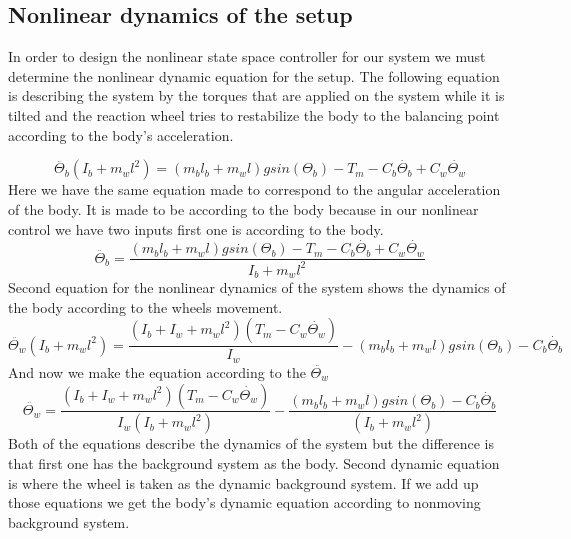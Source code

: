 \subsection{Nonlinear dynamics of the setup}

In order to design the nonlinear state space controller for our system we must determine the nonlinear dynamic equation for the setup.
The following equation is describing the system by the torques that are applied on the system while it is tilted and the reaction wheel tries to restabilize the body to the balancing point according to the body's acceleration.

\begin{equation}
\label{eq:Non-linear dynamics11}
\ddot{\Theta_{b}}(I_{b}+m_{w}l^{2})=(m_{b}l_{b}+m_{w}l)gsin(\Theta_{b})-T_{m}-C_{b}\dot{\Theta_{b}}+C_{w}\dot{\Theta_{w}}
\end{equation}
Here we have the same equation made to correspond to the angular acceleration of the body.
It is made to be according to the body because in our nonlinear control we have two inputs first one is according to the body.
\begin{equation}
\label{eq:Non-linear dynamics12}
\ddot{\Theta_{b}}=\frac{(m_{b}l_{b}+m_{w}l)gsin(\Theta_{b})-T_{m}-C_{b}\dot{\Theta_{b}}+C_{w}\dot{\Theta_{w}}}{I_{b}+m_{w}l^{2}}
\end{equation}
Second equation for the nonlinear dynamics of the system shows the dynamics of the body according to the wheels movement.
\begin{equation}
\label{eq:Non-linear dynamics21}
\ddot{\Theta_{w}}(I_{b}+m_{w}l^{2})=\frac{(I_{b}+I_{w}+m_{w}l^{2})(T_{m}-C_{w}\dot{\Theta_{w}})}{I_{w}}-(m_{b}l_{b}+m_{w}l)gsin(\Theta_{b})-C_{b}\dot{\Theta_{b}}
\end{equation}
And now we make the equation according to the $\ddot{\Theta_{w}}$
\begin{equation}
\label{eq:Non-linear dynamics22}
\ddot{\Theta_{w}}=\frac{(I_{b}+I_{w}+m_{w}l^{2})(T_{m}-C_{w}\dot{\Theta_{w}})}{I_{w}(I_{b}+m_{w}l^{2})}-\frac{(m_{b}l_{b}+m_{w}l)gsin(\Theta_{b})-C_{b}\dot{\Theta_{b}}}{(I_{b}+m_{w}l^{2})}
\end{equation}
Both of the equations describe the dynamics of the system but the difference is that first one has the background system as the body.
Second dynamic equation is where the wheel is taken as the dynamic background system.
If we add up those equations we get the body's dynamic equation according to nonmoving background system.














